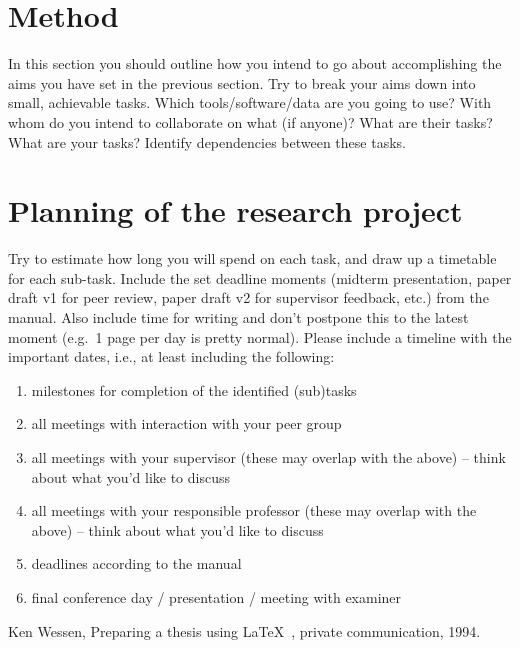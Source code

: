 \documentclass[english]{article}
\begin{document}
\section*{Method}
In this section you should outline how you intend to go
about accomplishing the aims you have set in the previous
section. Try to break your aims down into small, achievable tasks. 
Which tools/software/data are you going to use? With whom do you intend to collaborate on what (if anyone)? What are their tasks? What are your tasks?
Identify dependencies between these tasks.

\section*{Planning of the research project}
Try to estimate how long you will spend on each task, and draw up a timetable for each sub-task.
Include the set deadline moments (midterm presentation, paper draft v1 for peer review, paper draft v2 for supervisor feedback, etc.) from the manual. Also include time for writing and don't postpone this to the latest moment (e.g.\ 1 page per day is pretty normal).
Please include a timeline with the important dates, i.e., at least including the following:
\begin{enumerate}
\item milestones for completion of the identified (sub)tasks
\item all meetings with interaction with your peer group
\item all meetings with your supervisor (these may overlap with the above) -- think about what you'd like to discuss
\item all meetings with your responsible professor (these may overlap with the above)  -- think about what you'd like to discuss
\item deadlines according to the manual
\item final conference day / presentation / meeting with examiner
\end{enumerate}

%
%

\begin{thebibliography}{9}
 Ken Wessen, Preparing a thesis using \LaTeX~, private
communication, 1994.
\end{thebibliography}
\end{document}
